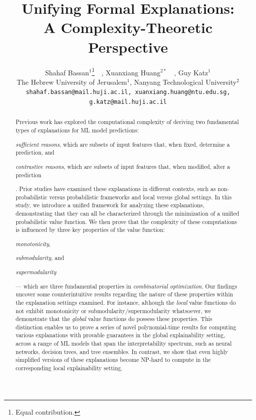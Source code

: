 \documentclass{article}
\title{\centering Unifying Formal Explanations: \\ A Complexity-Theoretic Perspective}
\author{%
  Shahaf Bassan$^{1}$\thanks{Equal contribution.}\ \ , Xuanxiang Huang$^{2*}$\ \ , Guy Katz$^{1}$ \\
  The Hebrew University of Jerusalem$^{1}$, Nanyang Technological University$^{2}$\\
{\texttt{shahaf.bassan@mail.huji.ac.il, xuanxiang.huang@ntu.edu.sg,}} \\
\texttt{g.katz@mail.huji.ac.il}
}
\begin{document}
\maketitle


\begin{abstract}
    Previous work has explored the computational complexity of deriving two fundamental types of explanations for ML model predictions:  
\begin{inparaenum}[(i)] \item \emph{sufficient reasons}, which are subsets of input features that, when fixed, determine a prediction, and  
\item \emph{contrastive reasons}, which are subsets of input features that, when modified, alter a prediction\end{inparaenum}. Prior studies have examined these explanations in different contexts, such as non-probabilistic versus probabilistic frameworks and local versus global settings. In this study, we introduce a unified framework for analyzing these explanations, demonstrating that they can all be characterized through the minimization of a unified probabilistic value function. We then prove that the complexity of these computations is influenced by three key properties of the value function: \begin{inparaenum}[(i)] \item \emph{monotonicity}, \item \emph{submodularity}, and \item \emph{supermodularity} \end{inparaenum} --- which are three fundamental properties in \emph{combinatorial optimization}. Our findings uncover some counterintuitive results regarding the nature of these properties within the explanation settings examined. For instance, although the \emph{local} value functions do not exhibit monotonicity or submodularity/supermodularity whatsoever, we demonstrate that the \emph{global} value functions do possess these properties. This distinction enables us to prove a series of novel polynomial-time results for computing various explanations with provable guarantees in the global explainability setting, across a range of ML models that span the interpretability spectrum, such as neural networks, decision trees, and tree ensembles. In contrast, we show that even highly simplified versions of these explanations become NP-hard to compute in the corresponding local explainability setting.\end{abstract}
\end{document}
